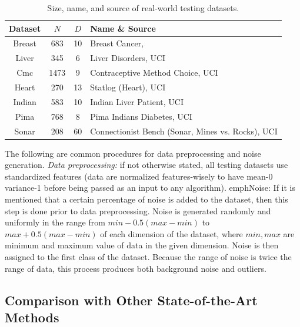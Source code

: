 \begin{table}[htbp!]
\centering
{\footnotesize
\begin{tabular}{c  c c l}
\hline\hline
Dataset & $N$ & $D$ & Name \& Source \\
\hline
Breast & 683 & 10 & Breast Cancer, \cite{breast} \\
Liver & 345 & 6 & Liver Disorders, UCI \\
Cmc & 1473 & 9 & Contraceptive Method Choice, UCI\\
Heart & 270 & 13 & Statlog (Heart), UCI\\
Indian & 583 & 10 & Indian Liver Patient, UCI\\
Pima & 768 & 8 & Pima Indians Diabetes, UCI\\
Sonar & 208 & 60 & Connectionist Bench (Sonar, Mines vs. Rocks), UCI\\
\hline\hline
\end{tabular}}
\caption{Size, name, and source of real-world testing datasets.} 
\label{tab:datasets}
\end{table}

The following are common procedures for data preprocessing and noise
generation.  \emph{Data preprocessing:} if not otherwise stated, all
testing datasets use standardized features (data are normalized
features-wisely to have mean-0 variance-1 before being passed as an
input to any algorithm).  emph{Noise:} If it is mentioned that a
certain percentage of noise is added to the dataset, then this step is
done prior to data preprocessing. Noise is generated randomly and
uniformly in the range from $min - 0.5(max-min)$ to $max +
0.5(max-min)$ of each dimension of the dataset, where $min, max$ are
minimum and maximum value of data in the given dimension. Noise is
then assigned to the first class of the dataset. Because the range of
noise is twice the range of data, this process produces both
background noise and outliers.

\subsection{Comparison with Other State-of-the-Art Methods}
\label{sec:rc.others}

